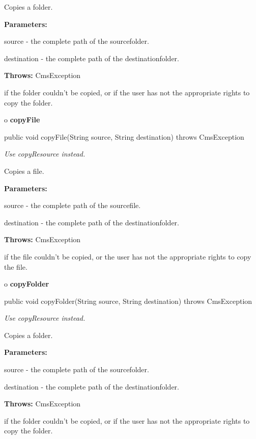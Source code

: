 \begin{description}
\htmlDD Copies a folder.

\begin{description}
\item {\bf Parameters:}

source - the complete path of the sourcefolder.

destination - the complete path of the destinationfolder.
\item {\bf Throws:} CmsException

if the folder couldn't be copied, or if the user has not the appropriate
rights to copy the folder.
\end{description}

\end{description}

o {\bf copyFile}

\begin{PRE}
 public void copyFile(String source,
                      String destination) throws CmsException
\end{PRE}

\begin{description}
 {\it Use copyResource instead.}

Copies a file.

\begin{description}
\item {\bf Parameters:}

source - the complete path of the sourcefile.

destination - the complete path of the destinationfolder.
\item {\bf Throws:} CmsException

if the file couldn't be copied, or the user has not the appropriate rights to
copy the file.
\end{description}

\end{description}

o {\bf copyFolder}

\begin{PRE}
 public void copyFolder(String source,
                        String destination) throws CmsException
\end{PRE}

\begin{description}
 {\it Use copyResource
instead.}

Copies a folder.

\begin{description}
\item {\bf Parameters:}

source - the complete path of the sourcefolder.

destination - the complete path of the destinationfolder.
\item {\bf Throws:} CmsException

if the folder couldn't be copied, or if the user has not the appropriate
rights to copy the folder.
\end{description}

\end{description}

